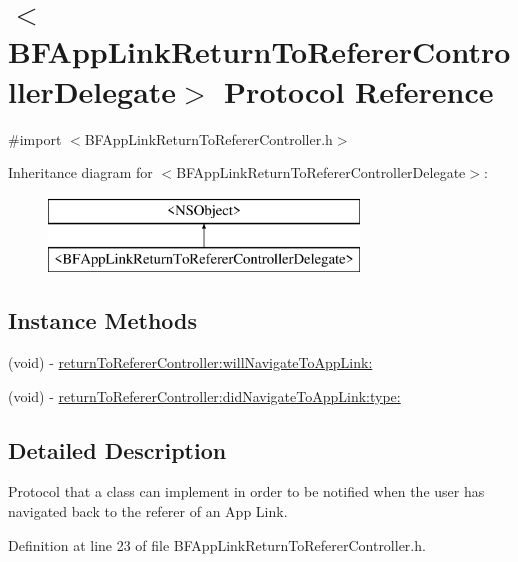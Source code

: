 \hypertarget{protocol_b_f_app_link_return_to_referer_controller_delegate-p}{}\section{$<$B\+F\+App\+Link\+Return\+To\+Referer\+Controller\+Delegate$>$ Protocol Reference}
\label{protocol_b_f_app_link_return_to_referer_controller_delegate-p}


{\ttfamily \#import $<$B\+F\+App\+Link\+Return\+To\+Referer\+Controller.\+h$>$}

Inheritance diagram for $<$B\+F\+App\+Link\+Return\+To\+Referer\+Controller\+Delegate$>$\+:\begin{figure}[H]
\begin{center}
\leavevmode
\includegraphics[height=2.000000cm]{protocol_b_f_app_link_return_to_referer_controller_delegate-p}
\end{center}
\end{figure}
\subsection*{Instance Methods}
\begin{DoxyCompactItemize}
\item 
(void) -\/ \hyperlink{protocol_b_f_app_link_return_to_referer_controller_delegate-p_aaea360a5dbe5f3676c5821fbdcad9913}{return\+To\+Referer\+Controller\+:will\+Navigate\+To\+App\+Link\+:}
\item 
(void) -\/ \hyperlink{protocol_b_f_app_link_return_to_referer_controller_delegate-p_a204e256c1d32c7906a11662bed988c2a}{return\+To\+Referer\+Controller\+:did\+Navigate\+To\+App\+Link\+:type\+:}
\end{DoxyCompactItemize}


\subsection{Detailed Description}
Protocol that a class can implement in order to be notified when the user has navigated back to the referer of an App Link. 

Definition at line 23 of file B\+F\+App\+Link\+Return\+To\+Referer\+Controller.\+h.




